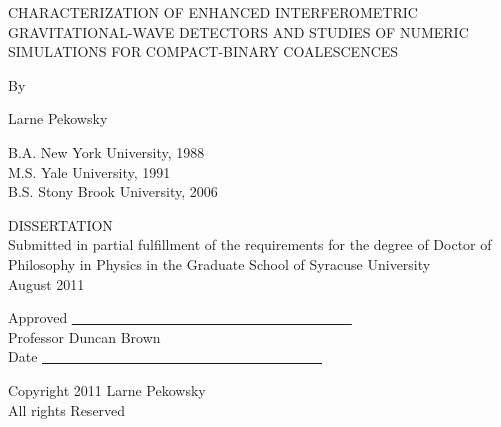 \documentclass[12pt,notitlepage]{report}
\begin{document}
\newpage

\begin{center}
\vspace*{0.75in}

CHARACTERIZATION OF ENHANCED INTERFEROMETRIC GRAVITATIONAL-WAVE
DETECTORS AND STUDIES OF NUMERIC SIMULATIONS FOR COMPACT-BINARY
COALESCENCES

\vspace*{0.75in}

By
\vspace*{0.25in}

Larne Pekowsky

B.A. New York University, 1988 \\
M.S. Yale University, 1991 \\
B.S. Stony Brook University, 2006 \\ 

\vspace{0.75in}

DISSERTATION \\

\vspace{0.5 in}
Submitted in partial fulfillment of the requirements for the degree of
Doctor of Philosophy in Physics in the Graduate School of Syracuse
University \\
\vspace*{0.25in}
August 2011
\end{center}

\vspace*{1.00in}

\begin{flushright}

Approved \underline{~~~~~~~~~~~~~~~~~~~~~~~~~~~~~~~~~~~~~~~~} \\
Professor Duncan Brown \\
Date \underline{~~~~~~~~~~~~~~~~~~~~~~~~~~~~~~~~~~~~~~~~} \\

\end{flushright}

\newpage
\begin{center}
\vspace*{1.00in}
Copyright 2011 Larne Pekowsky \\
All rights Reserved
\end{center}
\newpage


\author{\bf Larne Pekowsky}
\end{document}
